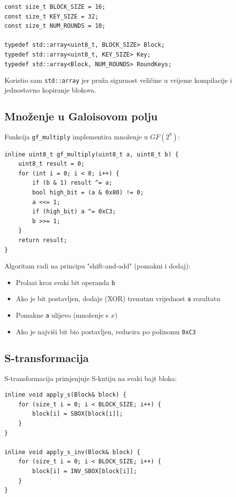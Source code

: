 \documentclass[12pt,a4paper]{article}
\begin{document}
\begin{lstlisting}[style=cpp, caption={Definicije tipova}, label={lst:types}]
const size_t BLOCK_SIZE = 16;
const size_t KEY_SIZE = 32;
const size_t NUM_ROUNDS = 10;

typedef std::array<uint8_t, BLOCK_SIZE> Block;
typedef std::array<uint8_t, KEY_SIZE> Key;
typedef std::array<Block, NUM_ROUNDS> RoundKeys;
\end{lstlisting}

Koristio sam \texttt{std::array} jer pruža sigurnost veličine u vrijeme kompilacije i jednostavno kopiranje blokova.

\subsection{Množenje u Galoisovom polju}

Funkcija \texttt{gf\_multiply} implementira množenje u $GF(2^8)$:

\begin{lstlisting}[style=cpp, caption={Množenje u GF(2\^{}8)}, label={lst:gf}]
inline uint8_t gf_multiply(uint8_t a, uint8_t b) {
    uint8_t result = 0;
    for (int i = 0; i < 8; i++) {
        if (b & 1) result ^= a;
        bool high_bit = (a & 0x80) != 0;
        a <<= 1;
        if (high_bit) a ^= 0xC3;
        b >>= 1;
    }
    return result;
}
\end{lstlisting}

Algoritam radi na principu "shift-and-add" (pomakni i dodaj):
\begin{itemize}
    \item Prolazi kroz svaki bit operanda \texttt{b}
    \item Ako je bit postavljen, dodaje (XOR) trenutnu vrijednost \texttt{a} rezultatu
    \item Pomakne \texttt{a} ulijevo (množenje s $x$)
    \item Ako je najviši bit bio postavljen, reducira po polinomu \texttt{0xC3}
\end{itemize}

\subsection{S-transformacija}

S-transformacija primjenjuje S-kutiju na svaki bajt bloka:

\begin{lstlisting}[style=cpp, caption={S-transformacija}, label={lst:s}]
inline void apply_s(Block& block) {
    for (size_t i = 0; i < BLOCK_SIZE; i++) {
        block[i] = SBOX[block[i]];
    }
}

inline void apply_s_inv(Block& block) {
    for (size_t i = 0; i < BLOCK_SIZE; i++) {
        block[i] = INV_SBOX[block[i]];
    }
}
\end{lstlisting}
\end{document}
